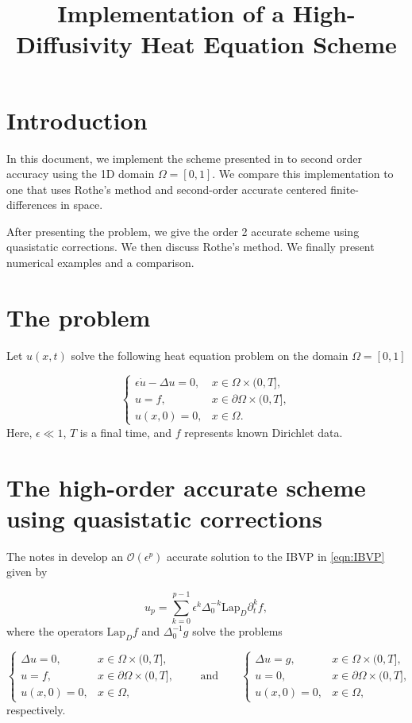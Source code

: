 \documentclass[11pt]{article}
\title{Implementation of a High-Diffusivity Heat Equation Scheme\vspace{-3ex}}
\numberwithin{equation}{section}
\newcommand{\Lap}[1]{\text{Lap}_{D}#1}
\newcommand{\lap}[1]{\Delta_{0}^{-1}#1}
\begin{document}
\maketitle	

\section{Introduction}
In this document, we implement the scheme presented in \cite{quasistaticNotes} to second order accuracy using the 1D domain $\Omega = [0,1]$. We compare this implementation to one that uses Rothe's method and second-order accurate centered finite-differences in space. 

After presenting the problem, we give the order 2 accurate scheme using quasistatic corrections. We then discuss Rothe's method. We finally present numerical examples and a comparison. 

\section{The problem}
Let $u(x,t)$ solve the following heat equation problem on the domain $\Omega = [0,1]$

\begin{equation}\label{eqn:IBVP}
\begin{cases}
\epsilon \dot{u} - \Delta u = 0, & x \in\Omega\times(0,T], \\ 
u = f, & x \in\partial \Omega\times (0,T], \\
u(x,0) = 0, & x\in\Omega.
\end{cases}
\end{equation}
Here, $\epsilon\ll 1$, $T$ is a final time, and $f$ represents known Dirichlet data.
\section{The high-order accurate scheme using quasistatic corrections}
The notes in \cite{quasistaticNotes} develop an $\mathcal{O}(\epsilon^p)$ accurate solution to the IBVP in \eqref{eqn:IBVP} given by 

\begin{equation}
u_p = \sum_{k = 0}^{p-1} \epsilon^k \Delta_0^{-k}\Lap\partial_t^{k}f, 
\end{equation}
where the operators $\Lap f$ and $\lap g$ solve the problems 

\begin{equation*}\begin{cases}
\Delta u = 0, & x \in\Omega\times(0,T], \\ 
u = f, & x \in\partial \Omega\times (0,T], \\
u(x,0) = 0, &x\in\Omega,
\end{cases} \qquad \text{and} \qquad 
  \begin{cases}
\Delta u = g, & x \in\Omega\times(0,T], \\
u = 0, & x \in\partial \Omega\times (0,T], \\
u(x,0) = 0, &x\in\Omega,
\end{cases}
\end{equation*}
respectively.
\end{document}
